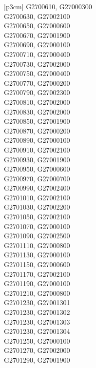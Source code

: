 \begin{customLongTable}{ |p{3cm}| }
G2700610, G27000300 \\ \hline
G2700630, G27002100 \\ \hline
G2700650, G27000600 \\ \hline
G2700670, G27001900 \\ \hline
G2700690, G27000100 \\ \hline
G2700710, G27000400 \\ \hline
G2700730, G27002000 \\ \hline
G2700750, G27000400 \\ \hline
G2700770, G27000200 \\ \hline
G2700790, G27002300 \\ \hline
G2700810, G27002000 \\ \hline
G2700830, G27002000 \\ \hline
G2700850, G27001900 \\ \hline
G2700870, G27000200 \\ \hline
G2700890, G27000100 \\ \hline
G2700910, G27002100 \\ \hline
G2700930, G27001900 \\ \hline
G2700950, G27000600 \\ \hline
G2700970, G27000700 \\ \hline
G2700990, G27002400 \\ \hline
G2701010, G27002100 \\ \hline
G2701030, G27002200 \\ \hline
G2701050, G27002100 \\ \hline
G2701070, G27000100 \\ \hline
G2701090, G27002500 \\ \hline
G2701110, G27000800 \\ \hline
G2701130, G27000100 \\ \hline
G2701150, G27000600 \\ \hline
G2701170, G27002100 \\ \hline
G2701190, G27000100 \\ \hline
G2701210, G27000800 \\ \hline
G2701230, G27001301 \\ \hline
G2701230, G27001302 \\ \hline
G2701230, G27001303 \\ \hline
G2701230, G27001304 \\ \hline
G2701250, G27000100 \\ \hline
G2701270, G27002000 \\ \hline
G2701290, G27001900 \\ \hline

\end{customLongTable}
